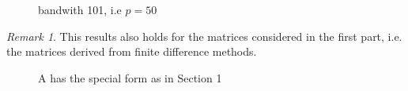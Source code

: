 \documentclass{article}
\numberwithin{pic}{section}
\numberwithin{lem}{section}
\numberwithin{thm}{section}
\numberwithin{cor}{section}
\theoremstyle{definition}
\numberwithin{ex}{section}
\numberwithin{defn}{section}
\theoremstyle{definition}
\theoremstyle{remark}
\newtheorem{rem}{Remark}
\begin{document}
\begin{figure}[H] 

    \caption{bandwith 101, i.e $p=50$}
\end{figure} 
\begin{rem}
This results also holds for the matrices considered in the first part, i.e. the matrices derived from finite difference methods.
\end{rem}
\begin{figure}[H] 

    \caption{A has the special form as in Section 1}
\end{figure} 
\end{document}

